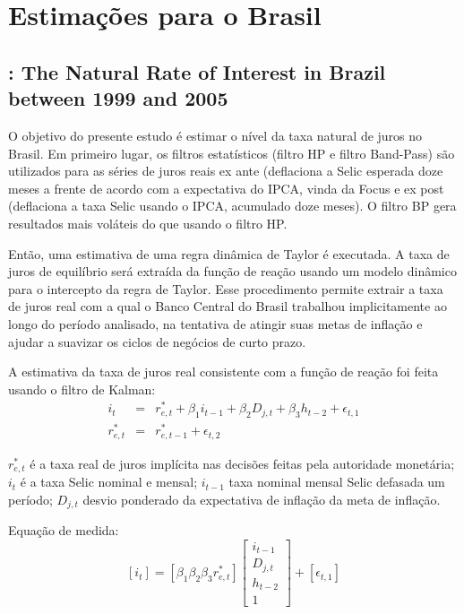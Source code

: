 \chapter{Estimações para o Brasil}


\section{\citet{Portugal:2009}: The Natural Rate of Interest in Brazil between 1999 and 2005}
O objetivo do presente estudo é estimar o nível da taxa natural de juros no Brasil. Em primeiro lugar, os filtros estatísticos (filtro HP e filtro Band-Pass) são utilizados para as séries de juros reais ex ante (deflaciona a Selic esperada doze meses a frente de acordo com a expectativa do IPCA, vinda da Focus  e ex post (deflaciona a taxa Selic usando o IPCA, acumulado doze meses). O filtro BP gera resultados mais voláteis do que usando o filtro HP.

Então, uma estimativa de uma regra dinâmica de Taylor é executada. A taxa de juros de equilíbrio será extraída da função de reação usando um modelo dinâmico para o intercepto da regra de Taylor. Esse procedimento permite extrair a taxa de juros real com a qual o Banco Central do Brasil trabalhou implicitamente ao longo do período analisado, na tentativa de atingir suas metas de inflação e ajudar a suavizar os ciclos de negócios de curto prazo.

A estimativa da taxa de juros real consistente com a função de reação foi feita usando o filtro de Kalman:
\begin{eqnarray}
    i_t &=& r_{e,t}^{*} + \beta_{1} i_{t-1} + \beta_{2}D_{j,t} + \beta_{3}h_{t-2} + \epsilon_{t,1} \\
    r_{e,t}^{*} &=& r_{e,t-1}^{*} + \epsilon_{t,2}
\end{eqnarray}

$r_{e,t}^{*} $ é a taxa real de juros implícita nas decisões feitas pela autoridade monetária; $i_t$ é a taxa Selic nominal e mensal; $i_{t-1}$ taxa nominal mensal Selic defasada um período; $D_{j,t}$ desvio ponderado da expectativa de inflação da meta de inflação.

Equação de medida:
$$ [i_t] = [ \beta_1  \beta_2  \beta_3  r_{e,t}^{*} ] \left[ \begin{array}{}
    i_{t-1} \\
    D_{j,t} \\
    h_{t-2} \\
    1
\end{array} \right] + [\epsilon_{t,1} ]$$

